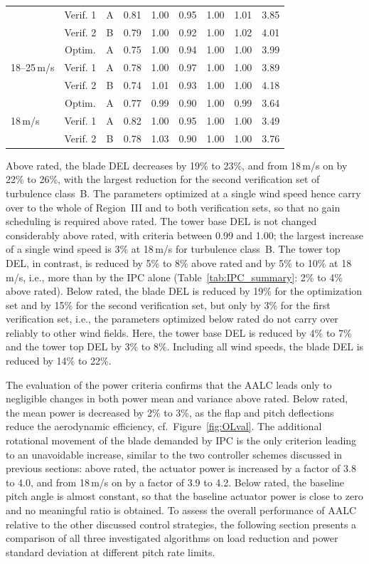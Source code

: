 \begin{table}[h]
\begin{tabular}{@{}l*{8}{c}@{}}
        & Verif. 1 & A & 0.81 & 1.00 & 0.95 & 1.00 & 1.01 & 3.85 \\
        & Verif. 2 & B & 0.79 & 1.00 & 0.92 & 1.00 & 1.02 & 4.01 \\
        \midrule
        \multirow{3}{*}{18--25\,m/s} & Optim. & A & 0.75 & 1.00 & 0.94 & 1.00 & 1.00 & 3.99 \\
        & Verif. 1 & A & 0.78 & 1.00 & 0.97 & 1.00 & 1.00 & 3.89 \\
        & Verif. 2 & B & 0.74 & 1.01 & 0.93 & 1.00 & 1.00 & 4.18 \\
        \midrule
        \multirow{3}{*}{18\,m/s} & Optim. & A & 0.77 & 0.99 & 0.90 & 1.00 & 0.99 & 3.64 \\
        & Verif. 1 & A & 0.82 & 1.00 & 0.95 & 1.00 & 1.00 & 3.49 \\
        & Verif. 2 & B & 0.78 & 1.03 & 0.90 & 1.00 & 1.00 & 3.76 \\
        \bottomrule
    \end{tabular}
\end{table}


Above rated, the blade DEL decreases by 19\% to 23\%, and from 18\,m/s on by 22\% to 26\%, with the largest reduction for the second verification set of turbulence class~B. The parameters optimized at a single wind speed hence carry over to the whole of Region~III and to both verification sets, so that no gain scheduling is required above rated. The tower base DEL is not changed considerably above rated, with criteria between 0.99 and 1.00; the largest increase of a single wind speed is 3\% at 18\,m/s for turbulence class~B. The tower top DEL, in contrast, is reduced by 5\% to 8\% above rated and by 5\% to 10\% at 18\,m/s, i.e., more than by the IPC alone (Table~\ref{tab:IPC_summary}: 2\% to 4\% above rated). Below rated, the blade DEL is reduced by 19\% for the optimization set and by 15\% for the second verification set, but only by 3\% for the first verification set, i.e., the parameters optimized below rated do not carry over reliably to other wind fields. Here, the tower base DEL is reduced by 4\% to 7\% and the tower top DEL by 3\% to 8\%. Including all wind speeds, the blade DEL is reduced by 14\% to 22\%.

The evaluation of the power criteria confirms that the AALC leads only to negligible changes in both power mean and variance above rated. Below rated, the mean power is decreased by 2\% to 3\%, as the flap and pitch deflections reduce the aerodynamic efficiency, cf.\ Figure~\ref{fig:OLval}. The additional rotational movement of the blade demanded by IPC is the only criterion leading to an unavoidable increase, similar to the two controller schemes discussed in previous sections: above rated, the actuator power is increased by a factor of 3.8 to 4.0, and from 18\,m/s on by a factor of 3.9 to 4.2. Below rated, the baseline pitch angle is almost constant, so that the baseline actuator power is close to zero and no meaningful ratio is obtained. To assess the overall performance of AALC relative to the other discussed control strategies, the following section presents a comparison of all three investigated algorithms on load reduction and  power standard deviation at different pitch rate limits.

